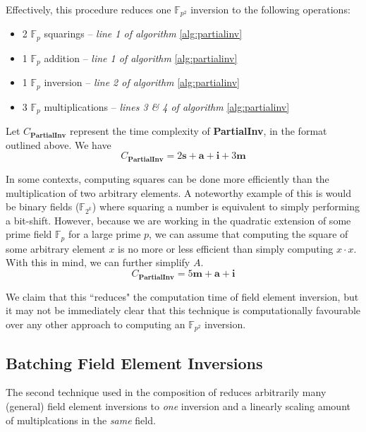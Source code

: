 Effectively, this procedure reduces one $\mathbb{F}_{p^{2}}$ inversion to the following operations: 

\begin{center}
\begin{itemize}
\item 2 $\mathbb{F}_{p}$ squarings -- \emph{line 1 of algorithm} \ref{alg:partialinv}
\item 1 $\mathbb{F}_{p}$ addition -- \emph{line 1 of algorithm} \ref{alg:partialinv}
\item 1 $\mathbb{F}_{p}$ inversion -- \emph{line 2 of algorithm} \ref{alg:partialinv}
\item 3 $\mathbb{F}_{p}$ multiplications -- \emph{lines 3 \& 4 of algorithm} \ref{alg:partialinv}
\end{itemize}
\end{center}

Let $C_{\textbf{PartialInv}}$ represent the time complexity of \textbf{PartialInv}, in the format outlined above. We have
$$
C_{\textbf{PartialInv}} = 2\textbf{s} + \textbf{a} + \textbf{i} + 3\textbf{m}
$$

In some contexts, computing squares can be done more efficiently than the multiplication of two arbitrary elements. A noteworthy example of this is would be binary fields ($\mathbb{F}_{2^k}$) where squaring a number is equivalent to simply performing a bit-shift. However, because we are working in the quadratic extension of some prime field $\mathbb{F}_p$ for a large prime $p$, we can assume that computing the square of some arbitrary element $x$ is no more or less efficient than simply computing $x \cdot x$. With this in mind, we can further simplify $A$.
$$
C_{\textbf{PartialInv}} = 5\textbf{m} + \textbf{a} + \textbf{i}
$$

We claim that this ``reduces" the computation time of field element inversion, but it may not be immediately clear that this technique is computationally favourable over any other approach to computing an $\mathbb{F}_{p^{2}}$ inversion. 

\subsection{Batching Field Element Inversions}
\label{subsec:batching}

The second technique used in the composition of  reduces arbitrarily many (general) field element inversions to \emph{one} inversion and a linearly scaling amount of multiplcations in the \emph{same} field.

